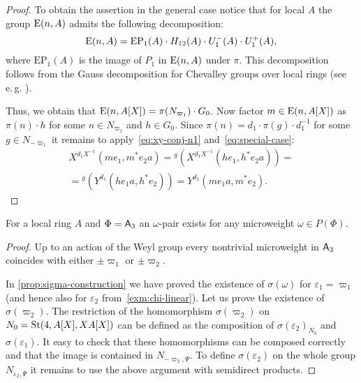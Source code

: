 \begin{proof}
    To obtain the assertion in the general case notice that for local $A$ the group $\operatorname{E}(n, A)$ admits the following decomposition:
    \[\operatorname{E}(n, A) = \mathrm{EP}_1(A) \cdot H_{12}(A) \cdot U^-_1(A) \cdot U^+_1(A), \]
    where $\mathrm{EP}_1(A)$ is the image of $P_1$ in $\operatorname{E}(n, A)$ under $\pi$.
    This decomposition follows from the Gauss decomposition for Chevalley groups over local rings (see e.\,g. \cite[Theorem~1.1]{Sm12}).

    Thus, we obtain that $\operatorname{E}(n, A[X]) = \pi(N_{\varpi_1}) \cdot G_0$.
    Now factor $m \in \operatorname{E}(n, A[X])$ as $\pi(n) \cdot h$ for some $n\in N_{\varpi_1}$ and $h \in G_0$.
    Since $\pi(n) = d_1 \cdot \pi(g) \cdot d_1^{-1}$ for some $g \in N_{-\varpi_1}$ it remains to apply~\eqref{eq:xy-conj-n1} and~\eqref{eq:special-case}:
    \begin{multline}
        \nonumber X^{d_1 X^{-1}}(me_1, m^*e_{2}a) = {}^{g}(X^{d_1 X^{-1}}(he_1, h^*e_{2}a)) = \\
        = {}^{g}(Y^{d_1}(he_{1}a, h^*e_2)) = Y^{d_1}(me_{1}a, m^{*} e_{2}).
    \end{multline}
\end{proof}

\begin{cor} \label{cor:a3-microweight}
    For a local ring $A$ and $\Phi = \mathsf{A}_3$ an $\omega$-pair exists for any microweight $\omega \in P(\Phi)$.
\end{cor}
\begin{proof}
    Up to an action of the Weyl group every nontrivial microweight in $\mathsf{A}_3$ coincides with either
    $\pm\varpi_1$ or $\pm\varpi_2$.

    In \cref{prop:sigma-construction} we have proved the existence of $\sigma(\omega)$ for $\varepsilon_1 = \varpi_1$ (and hence also for $\varepsilon_2$ from~\cref{exm:chi-linear}).
    Let us prove the existence of $\sigma(\varpi_2)$.
    The restriction of the homomorphism $\sigma(\varpi_2)$ on $N_0 = \operatorname{St}(4, A[X], XA[X])$ can be defined as the composition of
     $\sigma(\varepsilon_2)_{N_0}$ and $\sigma(\varepsilon_1)$.
    It easy to check that these homomorphisms can be composed correctly and that the image is contained in $N_{-\varpi_2, \Psi}$.
    To define $\sigma(\varepsilon_2)$ on the whole group $N_{\varepsilon_2, \Psi}$ it remains to use the above argument with semidirect products.
\end{proof}


